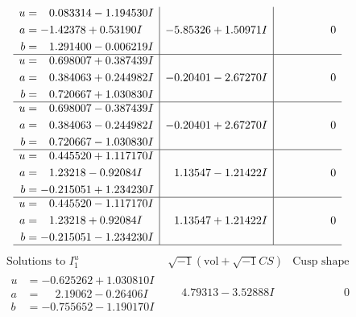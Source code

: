 \documentclass[1p]{elsarticle_modified}
\theoremstyle{definition}
\newcommand{\I}{\sqrt{-1}}
\begin{document}
$$\begin{array}{c|c|c}
\begin{aligned}
u &= \phantom{-}0.083314 - 1.194530 I \\
a &= -1.42378 + 0.53190 I \\
b &= \phantom{-}1.291400 - 0.006219 I\end{aligned}
 & -5.85326 + 1.50971 I & \phantom{-0.000000 } 0 \\ \hline\begin{aligned}
u &= \phantom{-}0.698007 + 0.387439 I \\
a &= \phantom{-}0.384063 + 0.244982 I \\
b &= \phantom{-}0.720667 + 1.030830 I\end{aligned}
 & -0.20401 - 2.67270 I & \phantom{-0.000000 } 0 \\ \hline\begin{aligned}
u &= \phantom{-}0.698007 - 0.387439 I \\
a &= \phantom{-}0.384063 - 0.244982 I \\
b &= \phantom{-}0.720667 - 1.030830 I\end{aligned}
 & -0.20401 + 2.67270 I & \phantom{-0.000000 } 0 \\ \hline\begin{aligned}
u &= \phantom{-}0.445520 + 1.117170 I \\
a &= \phantom{-}1.23218 - 0.92084 I \\
b &= -0.215051 + 1.234230 I\end{aligned}
 & \phantom{-}1.13547 - 1.21422 I & \phantom{-0.000000 } 0 \\ \hline\begin{aligned}
u &= \phantom{-}0.445520 - 1.117170 I \\
a &= \phantom{-}1.23218 + 0.92084 I \\
b &= -0.215051 - 1.234230 I\end{aligned}
 & \phantom{-}1.13547 + 1.21422 I & \phantom{-0.000000 } 0\\
 \hline 
 \end{array}$$\newpage$$\begin{array}{c|c|c}  
\text{Solutions to }I^u_{1}& \I (\text{vol} + \sqrt{-1}CS) & \text{Cusp shape}\\
 \hline 
\begin{aligned}
u &= -0.625262 + 1.030810 I \\
a &= \phantom{-}2.19062 - 0.26406 I \\
b &= -0.755652 - 1.190170 I\end{aligned}
 & \phantom{-}4.79313 - 3.52888 I & \phantom{-0.000000 } 0 \\ \hline\begin{aligned}

\end{aligned}
\end{array}$$
\end{document}
